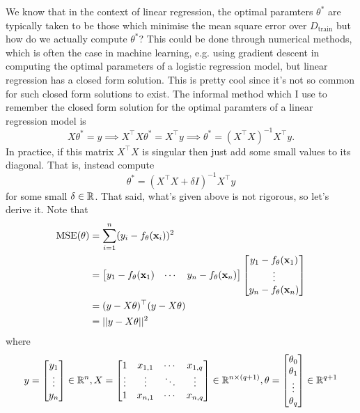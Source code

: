 \documentclass[11pt]{article}
\begin{document}
\noindent We know that in the context of linear regression, the optimal paramters $\theta^{*}$ are typically taken to be those which minimise the mean square error over $D_{\text{train}}$ but how do we actually compute $\theta^{*}$? This could be done through numerical methods, which is often the case in machine learning, e.g. using gradient descent in computing the optimal parameters of a logistic regression model, but linear regression has a closed form solution. This is pretty cool since it's not so common for such closed form solutions to exist. The informal method which I use to remember the closed form solution for the optimal paramters of a linear regression model is
$$
X\theta^{*}=y \implies X^{\top}X\theta^{*}=X^{\top}y \implies \theta^{*}=(X^{\top}X)^{-1}X^{\top}y.
$$
In practice, if this matrix $X^{\top}X$ is singular then just add some small values to its diagonal. That is, instead compute
$$
\theta^{*}=(X^{\top}X+\delta I)^{-1}X^{\top}y
$$
for some small $\delta\in\mathbb{R}$. That said, what's given above is not rigorous, so let's derive it. Note that
\begin{align*}
    \text{MSE}(\theta)
    &=
    \sum_{i=1}^n(y_i-f_{\theta}(\mathbf{x}_i))^2\\
    &=
    \begin{bmatrix}
        y_1-f_{\theta}(\mathbf{x}_1) & \cdots & y_n-f_{\theta}(\mathbf{x}_n)
    \end{bmatrix}
    \begin{bmatrix}
        y_1-f_{\theta}(\mathbf{x}_1)\\
        \vdots\\
        y_n-f_{\theta}(\mathbf{x}_n)
    \end{bmatrix}\\
    &=(y-X\theta)^{\top}(y-X\theta)\\
    &=||y-X\theta||^2
\end{align*}
where
$$
y
=
\begin{bmatrix}
    y_1\\
    \vdots\\
    y_n
\end{bmatrix}
\in\mathbb{R}^n,
X
=
\begin{bmatrix}
    1 & x_{1,1} & \cdots & x_{1,q}\\
    \vdots & \vdots & \ddots & \vdots\\
    1 & x_{n,1} & \cdots & x_{n,q}
\end{bmatrix}
\in\mathbb{R}^{n\times (q+1)},
\theta
=
\begin{bmatrix}
    \theta_0\\
    \theta_1\\
    \vdots\\
    \theta_q
\end{bmatrix}
\in\mathbb{R}^{q+1}
$$
\end{document}
